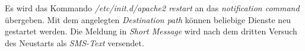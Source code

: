 Es wird das Kommando \emph{/etc/init.d/apache2 restart} an das \emph{notification command} übergeben. Mit dem angelegten \emph{Destination path} können beliebige Dienste neu gestartet werden. Die Meldung in \emph{Short Message} wird nach dem dritten Versuch des Neustarts als \emph{SMS-Text} versendet.
